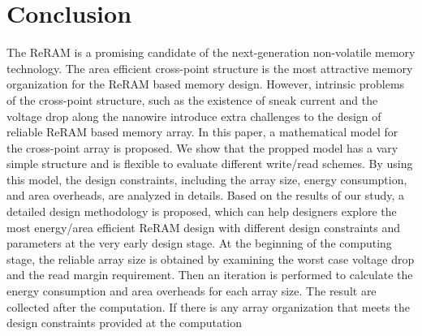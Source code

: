 \vspace{10pt}
\section{Conclusion}\label{sec:conclusion}

The ReRAM is a promising candidate of the next-generation non-volatile memory technology. The area efficient cross-point structure is the most attractive memory organization for the ReRAM based memory design. However, intrinsic problems of the cross-point structure, such as the existence of sneak current and the voltage drop along the nanowire introduce extra challenges to the design of reliable ReRAM based memory array. In this paper, a mathematical model for the cross-point array is proposed. We show that the propped model has a vary simple structure and is flexible to evaluate different write/read schemes. By using this model, the design constraints, including the array size, energy consumption, and area overheads, are analyzed in details. Based on the results of our study, a detailed design methodology is proposed, which can help designers explore the most energy/area efficient ReRAM design with different design constraints and parameters at the very early design stage.  At the beginning of the computing stage, the reliable array size is obtained by examining the worst case voltage drop and the read margin requirement. Then an iteration is performed to calculate the energy consumption and area overheads for each array size. The result are collected after the computation. If there is any array organization that meets the design constraints provided at   the computation
